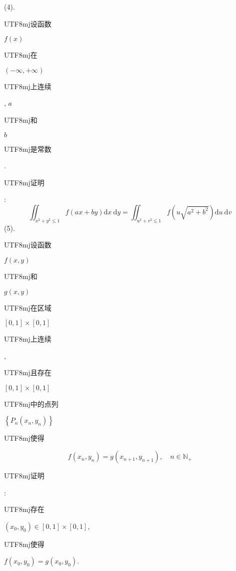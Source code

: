 \documentclass[10pt]{article}
\begin{document}
(4). \begin{CJK}{UTF8}{mj}设函数\end{CJK} $f(x)$ \begin{CJK}{UTF8}{mj}在\end{CJK} $(-\infty,+\infty)$ \begin{CJK}{UTF8}{mj}上连续\end{CJK}, $a$ \begin{CJK}{UTF8}{mj}和\end{CJK} $b$ \begin{CJK}{UTF8}{mj}是常数\end{CJK}. \begin{CJK}{UTF8}{mj}证明\end{CJK}:
$$
\iint_{x^{2}+y^{2} \leqslant 1} f(a x+b y) \mathrm{d} x \mathrm{~d} y=\iint_{u^{2}+v^{2} \leqslant 1} f\left(u \sqrt{a^{2}+b^{2}}\right) \mathrm{d} u \mathrm{~d} v
$$
(5). \begin{CJK}{UTF8}{mj}设函数\end{CJK} $f(x, y)$ \begin{CJK}{UTF8}{mj}和\end{CJK} $g(x, y)$ \begin{CJK}{UTF8}{mj}在区域\end{CJK} $[0,1] \times[0,1]$ \begin{CJK}{UTF8}{mj}上连续\end{CJK}, \begin{CJK}{UTF8}{mj}且存在\end{CJK} $[0,1] \times[0,1]$ \begin{CJK}{UTF8}{mj}中的点列\end{CJK} $\left\{P_{n}\left(x_{n}, y_{n}\right)\right\}$ \begin{CJK}{UTF8}{mj}使得\end{CJK}
$$
f\left(x_{n}, y_{n}\right)=g\left(x_{n+1}, y_{n+1}\right), \quad n \in \mathbb{N}_{+}
$$
\begin{CJK}{UTF8}{mj}证明\end{CJK}: \begin{CJK}{UTF8}{mj}存在\end{CJK} $\left(x_{0}, y_{0}\right) \in[0,1] \times[0,1]$, \begin{CJK}{UTF8}{mj}使得\end{CJK} $f\left(x_{0}, y_{0}\right)=g\left(x_{0}, y_{0}\right)$.
\end{document}
